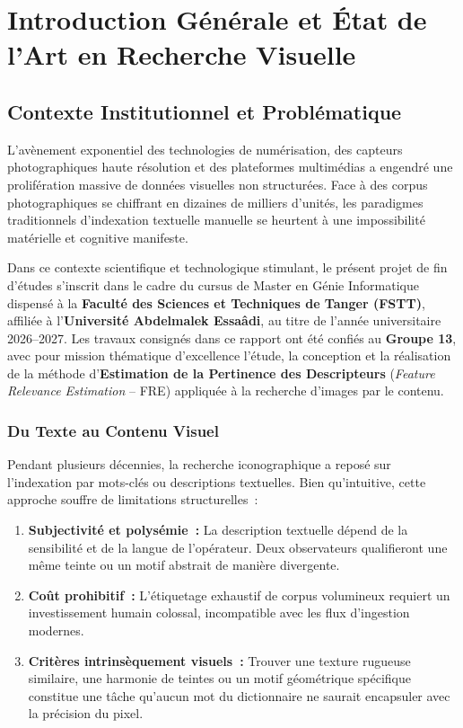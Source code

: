 \chapter{Introduction Générale et État de l'Art en Recherche Visuelle}
\label{chap:intro_etat_art}

\section{Contexte Institutionnel et Problématique}

L'avènement exponentiel des technologies de numérisation, des capteurs photographiques haute résolution et des plateformes multimédias a engendré une prolifération massive de données visuelles non structurées. Face à des corpus photographiques se chiffrant en dizaines de milliers d'unités, les paradigmes traditionnels d'indexation textuelle manuelle se heurtent à une impossibilité matérielle et cognitive manifeste.

Dans ce contexte scientifique et technologique stimulant, le présent projet de fin d'études s'inscrit dans le cadre du cursus de Master en Génie Informatique dispensé à la \textbf{Faculté des Sciences et Techniques de Tanger (FSTT)}, affiliée à l'\textbf{Université Abdelmalek Essaâdi}, au titre de l'année universitaire 2026--2027. Les travaux consignés dans ce rapport ont été confiés au \textbf{Groupe 13}, avec pour mission thématique d'excellence l'étude, la conception et la réalisation de la méthode d'\textbf{Estimation de la Pertinence des Descripteurs} (\textit{Feature Relevance Estimation} -- FRE) appliquée à la recherche d'images par le contenu.

\subsection{Du Texte au Contenu Visuel}
Pendant plusieurs décennies, la recherche iconographique a reposé sur l'indexation par mots-clés ou descriptions textuelles. Bien qu'intuitive, cette approche souffre de limitations structurelles~:
\begin{enumerate}[label=\bfseries\alph*.]
    \item \textbf{Subjectivité et polysémie~:} La description textuelle dépend de la sensibilité et de la langue de l'opérateur. Deux observateurs qualifieront une même teinte ou un motif abstrait de manière divergente.
    \item \textbf{Coût prohibitif~:} L'étiquetage exhaustif de corpus volumineux requiert un investissement humain colossal, incompatible avec les flux d'ingestion modernes.
    \item \textbf{Critères intrinsèquement visuels~:} Trouver une texture rugueuse similaire, une harmonie de teintes ou un motif géométrique spécifique constitue une tâche qu'aucun mot du dictionnaire ne saurait encapsuler avec la précision du pixel.
\end{enumerate}

